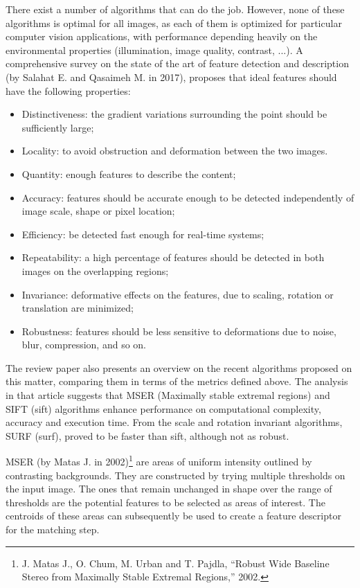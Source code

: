 There exist a number of algorithms that can do the job. However, none of these algorithms is optimal for all images, as each of them is optimized for particular computer vision applications, with performance depending heavily on the environmental properties (illumination, image quality, contrast, ...). A comprehensive survey on the state of the art of feature detection and description  \cite{featsift} (by Salahat E. and Qasaimeh M. in 2017), proposes that ideal features should have the following properties:
\begin{itemize}
	\item Distinctiveness: the gradient variations surrounding the point should be sufficiently large;
	\item Locality: to avoid obstruction and deformation between the two images.
	\item Quantity: enough features to describe the content;
	\item Accuracy: features should be accurate enough to be detected independently of image scale, shape or pixel location;
	\item Efficiency: be detected fast enough for real-time systems;
	\item Repeatability: a high percentage of features should be detected in both images on the overlapping regions;
	\item Invariance: deformative effects on the features, due to scaling, rotation or translation are minimized;
	\item Robustness: features should be less sensitive to deformations due to noise, blur, compression, and so on.
\end{itemize} 
The review paper also presents an overview on the recent algorithms proposed on this matter, comparing them in terms of the metrics defined above. The analysis in that article suggests that MSER (Maximally stable extremal regions) and SIFT (\acrlong{sift}) algorithms enhance performance on computational complexity, accuracy and execution time. From the scale and rotation invariant algorithms, SURF (\acrlong{surf}), proved to be faster than \acrshort{sift}, although not as robust.

MSER (by Matas J. in 2002)\footnote{J. Matas J., O. Chum, M. Urban and T. Pajdla, “Robust Wide Baseline Stereo from Maximally Stable Extremal Regions,” 2002.} are areas of uniform intensity outlined by contrasting backgrounds. They are constructed by trying multiple thresholds on the input image. The ones that remain unchanged in shape over the range of thresholds are the potential features to be selected as areas of interest. The centroids of these areas can subsequently be used to create a feature descriptor for the matching step.

